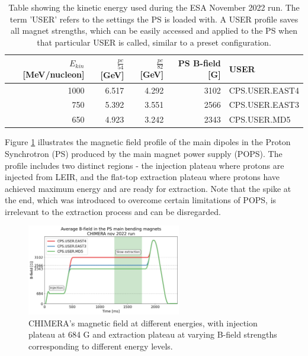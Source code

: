 \documentclass{cernatsnote}
\begin{document}
\begin{table}[h!]
\centering
\begin{tabular}{rrrrl}
\toprule
 $E_{kin}$ [MeV/nucleon] &  $\frac{pc}{54}$ [GeV] &  $\frac{pc}{82}$ [GeV] &  PS B-field [G] & USER\\
\midrule
  1000 &                        6.517 &                    4.292 &        3102 & CPS.USER.EAST4 \\
   750 &                        5.392 &                    3.551 &        2566 & CPS.USER.EAST3 \\
   650 &                        4.923 &                    3.242 &        2343 &   CPS.USER.MD5 \\
\bottomrule
\end{tabular}
\caption{Table showing the kinetic energy used during the ESA November 2022 run. The term 'USER' refers to the settings the PS is loaded with. A USER profile saves all magnet strengths, which can be easily accessed and applied to the PS when that particular USER is called, similar to a preset configuration.}
\label{table:KE_table}
\end{table}

Figure \ref{fig:bfield} illustrates the magnetic field profile of the main dipoles in the Proton Synchrotron (PS) produced by the main magnet power supply (POPS). The profile includes two distinct regions - the injection plateau where protons are injected from LEIR, and the flat-top extraction plateau where protons have achieved maximum energy and are ready for extraction. Note that the spike at the end, which was introduced to overcome certain limitations of POPS, is irrelevant to the extraction process and can be disregarded.

\begin{figure}[!htb]
\centering
\includegraphics[width=0.6\textwidth]{images/PS_BEAM_ENERGY/average_b_field_chimera.png}
\caption{CHIMERA's magnetic field at different energies, with injection plateau at 684 G and extraction plateau at varying B-field strengths corresponding to different energy levels.}
\label{fig:bfield}
\end{figure}
\end{document}
